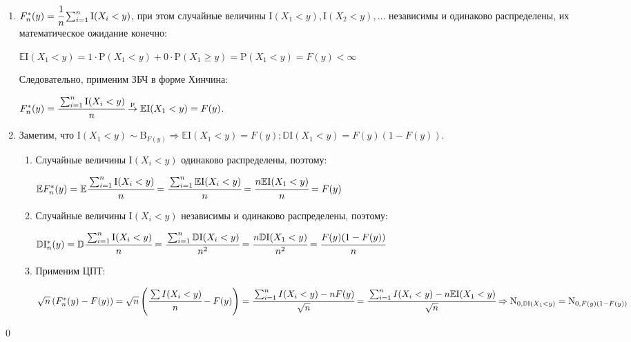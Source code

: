 \documentclass[oneside,final,14pt]{extreport}
\renewenvironment{proof}{{\bfseries Доказательство.}}{\qed}
\theoremstyle{definition}
\begin{document}
\begin{proof}\leavevmode
\begin{enumerate}
    \item \( F_{n}^{*}(y)=\cfrac{1}{n} \sum_{i=1}^{n} \mathrm{I}(X_{i}<y) \), при этом случайные величины \( \mathrm{I}(X_{1}<y), \mathrm{I}(X_{2}<y), \ldots \) независимы и одинаково распределены, их математическое ожидание конечно:
    
    \( \mathbb{E}\mathrm{I}(X_{1}<y)=1 \cdot \mathrm{P}(X_{1}<y)+0 \cdot \mathrm{P}(X_{1} \geqslant y)=\mathrm{P}(X_{1}<y)=F(y)<\infty \)

    Следовательно, применим ЗБЧ в форме Хинчина:
    
    \( F_{n}^{*}(y)=\cfrac{\sum_{i=1}^{n} \mathrm{I}(X_{i}<y)}{n} \stackrel{\mathrm{p}}{\rightarrow} \mathbb{E}\mathrm{I}(X_{1}<y)=F(y) \).
    
    \item Заметим, что \(\mathrm{I}(X_{1}<y) \sim  \mathrm{B}_{F(y)} \Rightarrow \mathbb{E}\mathrm{I}(X_{1}<y) = F(y); \mathbb{D}\mathrm{I}(X_{1}<y) = F(y)(1-F(y)) \).
    \begin{enumerate}[label={\arabic*)}]
        \item Случайные величины \(\mathrm{I}(X_{i}<y) \) одинаково распределены, поэтому:
    
        \( \mathbb{E} F_{n}^{*}(y)=\mathbb{E} \cfrac{\sum_{i=1}^{n} \mathrm{I}(X_{i}<y)}{n}=\cfrac{\sum_{i=1}^{n} \mathbb{E}\mathrm{I}(X_{i}<y)}{n}=\cfrac{n \mathbb{E}\mathrm{I}(X_{1}<y)}{n}=F(y) \)
        
        \item Случайные величины \(\mathrm{I}(X_{i}<y) \) независимы и одинаково распределены, поэтому:
        
        \( \mathbb{D}\mathrm{I}_{n}^{*}(y)=\mathbb{D} \cfrac{\sum_{i=1}^{n} \mathrm{I}(X_{i}<y)}{n}=\cfrac{\sum_{i=1}^{n} \mathbb{D}\mathrm{I}(X_{i}<y)}{n^{2}}=\cfrac{n \mathbb{D}\mathrm{I}(X_{1}<y)}{n^{2}}=\cfrac{F(y)(1-F(y))}{n} \)
        
        \item Применим ЦПТ:
        
        \( \sqrt{n}\left(F_{n}^{*}(y)-F(y)\right)=\sqrt{n}\left(\cfrac{\sum I(X_{i}<y)}{n}-F(y)\right) = \cfrac{\sum_{i=1}^{n} I(X_{i}<y)-n F(y)}{\sqrt{n}} = \cfrac{\sum_{i=1}^{n} I(X_{i}<y)-n \mathbb{E}\mathrm{I}(X_{1}<y)}{\sqrt{n}} \Rightarrow \mathrm{N}_{0, \mathbb{D}\mathrm{I}(X_{1}<y)}=\mathrm{N}_{0, F(y)(1-F(y))}
        \)
        
    \end{enumerate}
\end{enumerate}  
\end{proof}
\end{document}
